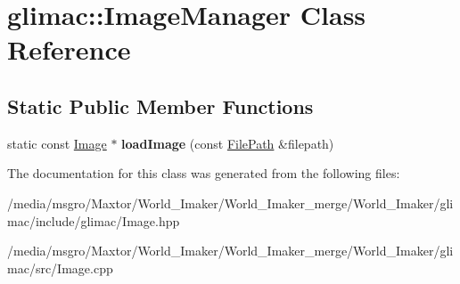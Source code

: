 \hypertarget{classglimac_1_1ImageManager}{}\section{glimac\+:\+:Image\+Manager Class Reference}
\label{classglimac_1_1ImageManager}
\subsection*{Static Public Member Functions}
\begin{DoxyCompactItemize}
\item 
\mbox{\label{classglimac_1_1ImageManager_a491965842042b2ef01eade7136ddb54d}} 
static const \hyperlink{classglimac_1_1Image}{Image} $\ast$ {\bfseries load\+Image} (const \hyperlink{classglimac_1_1FilePath}{File\+Path} \&filepath)
\end{DoxyCompactItemize}


The documentation for this class was generated from the following files\+:\begin{DoxyCompactItemize}
\item 
/media/msgro/\+Maxtor/\+World\+\_\+\+Imaker/\+World\+\_\+\+Imaker\+\_\+merge/\+World\+\_\+\+Imaker/glimac/include/glimac/Image.\+hpp\item 
/media/msgro/\+Maxtor/\+World\+\_\+\+Imaker/\+World\+\_\+\+Imaker\+\_\+merge/\+World\+\_\+\+Imaker/glimac/src/Image.\+cpp\end{DoxyCompactItemize}
